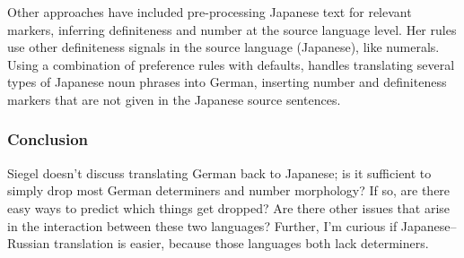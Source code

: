 \documentclass[11pt]{article}
\begin{document}
Other approaches have included pre-processing Japanese text for relevant markers, inferring definiteness and number at the source language level.
Her rules use other definiteness signals in the source language (Japanese), like numerals.
Using a combination of preference rules with defaults, handles translating several types of Japanese noun phrases into German, inserting number and definiteness markers that are not given in the Japanese source sentences.


\subsubsection*{Conclusion}

Siegel doesn't discuss translating German back to Japanese; is it sufficient to simply drop most German determiners and number morphology? If so, are there easy ways to predict which things get dropped? Are there other issues that arise in the interaction between these two languages? Further, I'm curious if Japanese--Russian translation is easier, because those languages both lack determiners.
\end{document}
